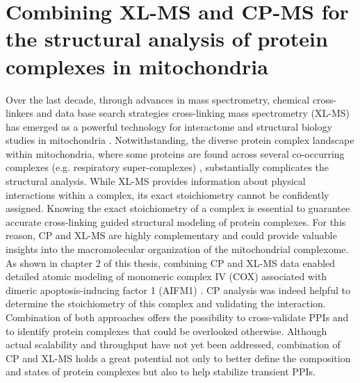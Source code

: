 \section{Combining XL-MS and CP-MS for the structural analysis of protein complexes in mitochondria}
Over the last decade, through advances in mass spectrometry, chemical cross-linkers and data base search strategies cross-linking mass spectrometry (XL-MS) has emerged as a powerful technology for interactome and structural biology studies in mitochondria \cite{Hevler_2021b, Liu_2018, Ryl_2020, Schweppe_2017}. Notwithstanding, the diverse protein complex landscape within mitochondria, where some proteins are found across several co-occurring complexes (e.g. respiratory super-complexes) \cite{Letts_2016, Rugolo_2021, Schägger_2000, Wu_2016}, substantially complicates the structural analysis. While XL-MS provides information about physical interactions within a complex, its exact stoichiometry cannot be confidently assigned. Knowing the exact stoichiometry of a complex is essential to guarantee accurate cross-linking guided structural modeling of protein complexes. For this reason, CP and XL-MS are highly complementary and could provide valuable insights into the macromolecular organization of the mitochondrial complexome. As shown in chapter 2 of this thesis, combining CP and XL-MS data enabled detailed atomic modeling of monomeric complex IV (COX) associated with dimeric apoptosis-inducing factor 1 (AIFM1) \cite{Hevler_2021b}. CP analysis was indeed helpful to determine the stoichiometry of this complex and validating the interaction. Combination of both approaches offers the possibility to cross-validate PPIs and to identify protein complexes that could be overlooked otherwise. Although actual scalability and throughput have not yet been addressed, combination of CP and XL-MS holds a great potential not only to better define the composition and states of protein complexes but also to help stabilize transient PPIs.

